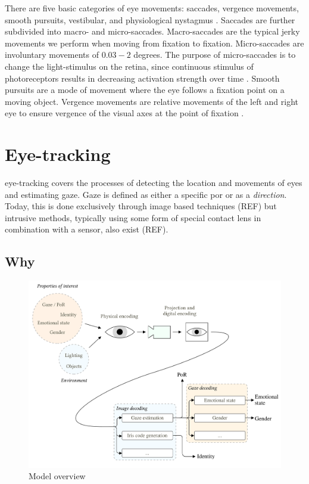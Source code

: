 There are five basic categories of eye movements: saccades, vergence movements, smooth pursuits, vestibular, and physiological nystagmus \parencite[39]{methodology}. Saccades are further subdivided into macro- and micro-saccades. Macro-saccades are the typical jerky movements we perform when moving from fixation to fixation. Micro-saccades are involuntary movements of $0.03-2$ degrees. The purpose of micro-saccades is to change the light-stimulus on the retina, since continuous stimulus of photoreceptors results in decreasing activation strength over time \parencite[44]{methodology}. Smooth pursuits are a mode of movement where the eye follows a fixation point on a moving object. Vergence movements are relative movements of the left and right eye to ensure vergence of the visual axes at the point of fixation \parencite{methodology}.


\section{Eye-tracking}\label{sec:eye-tracking}
\Gls{eye-tracking} covers the processes of detecting the location and movements of eyes and estimating \gls{gaze}. Gaze is defined as either a specific \acrfull{por} or as a \emph{direction}. Today, this is done exclusively through image based techniques (REF) but intrusive methods, typically using some form of special contact lens in combination with a sensor, also exist (REF).

\subsection{Why}
\begin{figure}
	\centering
	\includegraphics[width=1\textwidth]{figures/model/eye-tracking-model}
	\caption{Model overview}\label{fig:eye-tracking-model}
\end{figure}

